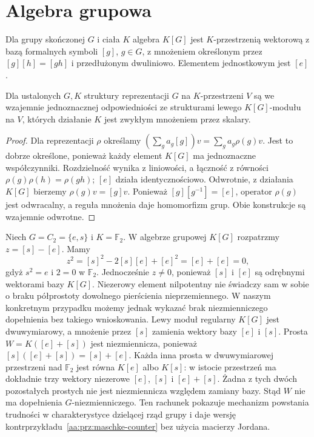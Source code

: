 \section{Algebra grupowa}
\begin{definicja}\label{aa:def:group-algebra-rep}
Dla grupy skończonej $G$ i ciała $K$ algebra $K[G]$ jest
$K$-przestrzenią wektorową z bazą formalnych symboli $[g]$,
$g\in G$, z mnożeniem określonym przez $[g][h]=[gh]$
i przedłużonym dwuliniowo. Elementem jednostkowym jest $[e]$.
\end{definicja}
\begin{stwierdzenie}\label{aa:prop:rep-modules}
Dla ustalonych $G,K$ struktury reprezentacji $G$ na
$K$-przestrzeni $V$ są we wzajemnie jednoznacznej odpowiedniości
ze strukturami lewego $K[G]$-modułu na $V$, których działanie
$K$ jest zwykłym mnożeniem przez skalary.
\end{stwierdzenie}
\begin{proof}
Dla reprezentacji $\rho$ określamy
$(\sum_g a_g[g])v=\sum_g a_g\rho(g)v$.
Jest to dobrze określone, ponieważ każdy element $K[G]$
ma jednoznaczne współczynniki. Rozdzielność wynika z liniowości,
a łączność z równości $\rho(g)\rho(h)=\rho(gh)$;
$[e]$ działa identycznościowo. Odwrotnie, z działania
$K[G]$ bierzemy $\rho(g)v=[g]v$. Ponieważ $[g][g^{-1}]=[e]$,
operator $\rho(g)$ jest odwracalny, a reguła mnożenia daje
homomorfizm grup. Obie konstrukcje są wzajemnie odwrotne.
\end{proof}


\begin{przyklad}
\label{aa:prz:group-algebra-modular}
Niech $G=C_2=\{e,s\}$ i $K=\mathbb F_2$.
W algebrze grupowej $K[G]$ rozpatrzmy
$z=[s]-[e]$. Mamy
\[
z^2=[s]^2-2[s][e]+[e]^2=[e]+[e]=0,
\]
gdyż $s^2=e$ i $2=0$ w $\mathbb F_2$.
Jednocześnie $z\ne0$, ponieważ $[s]$ i $[e]$
są odrębnymi wektorami bazy $K[G]$.
Niezerowy element nilpotentny nie świadczy sam w sobie
o braku półprostoty dowolnego pierścienia nieprzemiennego.
W naszym konkretnym przypadku możemy jednak wykazać
brak niezmienniczego dopełnienia bez takiego wnioskowania.
Lewy moduł regularny $K[G]$ jest dwuwymiarowy, a mnożenie
przez $[s]$ zamienia wektory bazy $[e]$ i $[s]$.
Prosta $W=K([e]+[s])$ jest niezmiennicza, ponieważ
$[s]([e]+[s])=[s]+[e]$.
Każda inna prosta w dwuwymiarowej przestrzeni nad
$\mathbb F_2$ jest równa $K[e]$ albo $K[s]$:
w istocie przestrzeń ma dokładnie trzy wektory niezerowe
$[e]$, $[s]$ i $[e]+[s]$. Żadna z tych dwóch pozostałych
prostych nie jest niezmiennicza względem zamiany bazy.
Stąd $W$ nie ma dopełnienia $G$-niezmienniczego.
Ten rachunek pokazuje mechanizm powstania trudności
w charakterystyce dzielącej rząd grupy i daje
wersję kontrprzykładu~\ref{aa:prz:maschke-counter}
bez użycia macierzy Jordana.
\end{przyklad}

